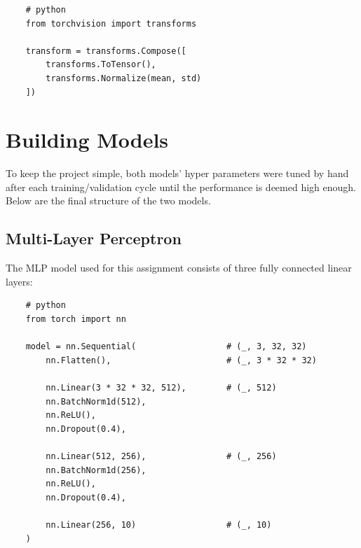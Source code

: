\documentclass{report}
\begin{document}
\newpage

\begin{verbatim}
    # python
    from torchvision import transforms

    transform = transforms.Compose([
        transforms.ToTensor(),
        transforms.Normalize(mean, std)
    ])
\end{verbatim}

\section{Building Models}
To keep the project simple, both models' hyper parameters were tuned by hand after each training/validation 
cycle until the performance is deemed high enough. Below are the final structure of the two models.

\subsection{Multi-Layer Perceptron}
The MLP model used for this assignment consists of three fully connected linear layers:

\begin{verbatim}
    # python
    from torch import nn

    model = nn.Sequential(                  # (_, 3, 32, 32)
        nn.Flatten(),                       # (_, 3 * 32 * 32)

        nn.Linear(3 * 32 * 32, 512),        # (_, 512)
        nn.BatchNorm1d(512),
        nn.ReLU(),
        nn.Dropout(0.4),

        nn.Linear(512, 256),                # (_, 256)
        nn.BatchNorm1d(256),
        nn.ReLU(),
        nn.Dropout(0.4),

        nn.Linear(256, 10)                  # (_, 10)
    )
\end{verbatim}
\end{document}
